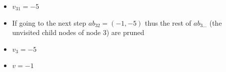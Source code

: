 \documentclass[11pt]{article}
\begin{document}
\begin{enumerate}
\begin{itemize}
    \item
    $v_{31} = -5$

    \item 
    If going to the next step $ab_{32}=(-1, -5)$ thus the rest of $ab_{3...}$ (the unvisited child nodes of node 3) are pruned

    \item
    $v_{3} = -5$

    \item
    $v = -1$

    

  \end{itemize}

\end{enumerate}
\end{document}
